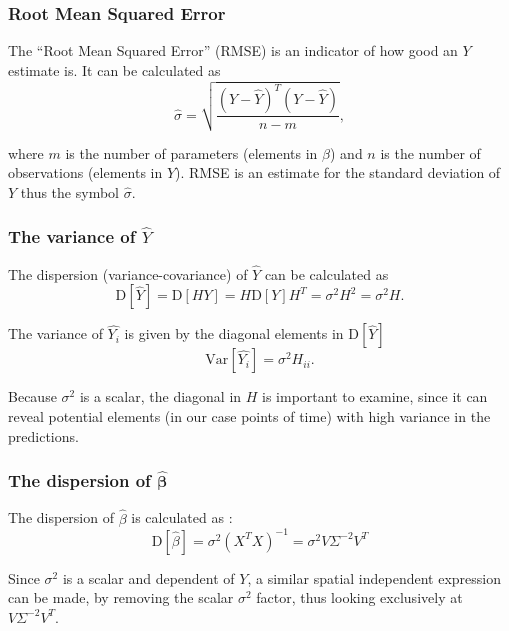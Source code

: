\subsubsection{Root Mean Squared Error}

The ``Root Mean Squared Error'' (RMSE) is an indicator of how good an $Y$ estimate is.
It can be calculated as
\begin{equation}
\hat{\sigma} = \sqrt{\frac{\left(Y - \hat{Y}\right)^T \left(Y - \hat{Y}\right)}{n-m}},
\end{equation}

where $m$ is the number of parameters (elements in $\beta$) and $n$ is the number of observations (elements in $Y$).
RMSE is an estimate for the standard deviation of $Y$ \cite[theorem~3.4]{time-series-analysis} thus the symbol $\hat{\sigma}$.


\subsubsection{The variance of $\hat{Y}$}

The dispersion (variance-covariance) of $\hat{Y}$ can be calculated as
\begin{equation}
\mathrm{D}[\hat{Y}] = \mathrm{D}[H Y] = H \mathrm{D}[Y] H^T = \sigma^2 H^2 = \sigma^2 H.
\end{equation}

The variance of $\hat{Y_i}$ is given by the diagonal elements in $\mathrm{D}[\hat{Y}]$
\begin{equation}
\mathrm{Var}[\hat{Y_i}] = \sigma^2 H_{ii}.
\end{equation}

Because $\sigma^2$ is a scalar, the diagonal in $H$ is important to examine, since it can reveal potential elements (in our case points of time) with high variance in the predictions.

\subsubsection{The dispersion of $\hat{\boldsymbol\beta}$}

The dispersion of $\hat{\beta}$ is calculated as \cite[theorem~3.2]{time-series-analysis}:
\begin{equation}
\mathrm{D}[\hat{\beta}] = \sigma^2 (X^T X)^{-1} = \sigma^2 V \Sigma^{-2} V^T
\end{equation}

Since $\sigma^2$ is a scalar and dependent of $Y$, a similar spatial independent expression can be made, by removing the scalar $\sigma^2$  factor, thus looking exclusively at $V \Sigma^{-2} V^T$.

